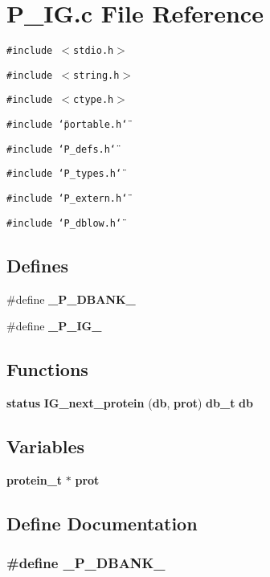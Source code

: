 \section{P\_\-IG.c File Reference}
\label{P__IG_8c}
{\tt \#include $<$stdio.h$>$}\par
{\tt \#include $<$string.h$>$}\par
{\tt \#include $<$ctype.h$>$}\par
{\tt \#include \char`\"{}portable.h\char`\"{}}\par
{\tt \#include \char`\"{}P\_\-defs.h\char`\"{}}\par
{\tt \#include \char`\"{}P\_\-types.h\char`\"{}}\par
{\tt \#include \char`\"{}P\_\-extern.h\char`\"{}}\par
{\tt \#include \char`\"{}P\_\-dblow.h\char`\"{}}\par
\subsection*{Defines}
\begin{CompactItemize}
\item 
\#define {\bf \_\-P\_\-DBANK\_\-}
\item 
\#define {\bf \_\-P\_\-IG\_\-}
\end{CompactItemize}
\subsection*{Functions}
\begin{CompactItemize}
\item 
{\bf status} {\bf IG\_\-next\_\-protein} ({\bf db}, {\bf prot}) {\bf db\_\-t} {\bf db}
\end{CompactItemize}
\subsection*{Variables}
\begin{CompactItemize}
\item 
{\bf protein\_\-t} $\ast$ {\bf prot}
\end{CompactItemize}


\subsection{Define Documentation}
\subsubsection{\setlength{\rightskip}{0pt plus 5cm}\#define \_\-P\_\-DBANK\_\-}\label{P__IG_8c_a0}


